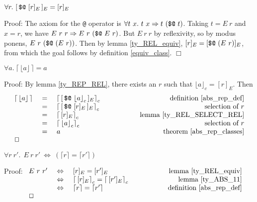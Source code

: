 \documentclass[envcountsame,runningheads]{llncs}
\begin{document}
\begin{lemma}
\label{ty_REL_SELECT_REL}
$\forall r.\ [ \, \mbox{\tt \$@} \ [ r ]_E \, ]_E = [ r ]_E$
\end{lemma}
Proof:
The axiom for the {\tt @} operator is
$\forall t\ x.\ t\ x \Rightarrow t\ (\mbox{\tt \$@}\ t)$.
Taking $t = E\ r$ and $x = r$, we have
$E\ r\ r \Rightarrow E\ r\ (\mbox{\tt \$@}\ E\ r)$.
But $E\ r\ r$ by reflexivity, so by modus ponens,
$E\ r\ (\mbox{\tt \$@} \ (E\ r))$.
Then
by lemma \ref{ty_REL_equiv},
$[ r ]_E = [ \mbox{\tt \$@} \ (E\ r) ]_E$, from which the goal follows
by definition \ref{equiv_class}.
$\Box$

\begin{theorem}
\label{ty_ABS_REP}
$\forall a.\ \lceil \, \lfloor a \rfloor \, \rceil = a$
\end{theorem}
Proof:
By lemma \ref{ty_REP_REL}, there exists an $r$ such that
$\lfloor a {\rfloor}_c = [ r ]_E$.  Then
$$
\begin{array}{rcl@{\hspace{2.0cm}}r}
\lceil \, \lfloor a \rfloor \, \rceil
& \ = \ &
\lceil \, [ \, \mbox{\tt \$@} \ \lfloor a {\rfloor}_c \, ]_E {\rceil}_c  
& \mbox{definition \ref{abs_rep_def}}  \\
& \ = \ &
\lceil \, [ \, \mbox{\tt \$@} \ [ r ]_E \, ]_E {\rceil}_c  
& \mbox{selection of $r$}  \\
& \ = \ &
\lceil \, [ r ]_E {\rceil}_c  
& \mbox{lemma \ref{ty_REL_SELECT_REL}}  \\
& \ = \ &
\lceil \, \lfloor a {\rfloor}_c {\rceil}_c  
& \mbox{selection of $r$}  \\
& \ = \ &
a 
& \mbox{theorem \ref{abs_rep_classes}}  \\
\Box \hfill & & &
\end{array}
$$


\begin{theorem}
\label{equiv_ty_ABS}
$\forall r\ r'.\ \ E\ r\ r' \ \Leftrightarrow \ 
(\lceil r \rceil = \lceil r' \rceil)$
\end{theorem}
Proof:
$
\begin{array}[t]{rcl@{\hspace{2.0cm}}r}
E\ r\ r'
& \ \Leftrightarrow \ &
[ r ]_E = [ r' ]_E
& \mbox{lemma \ref{ty_REL_equiv}}  \\
& \ \Leftrightarrow \ &
\lceil \, [ r ]_E {\rceil}_c = \lceil \, [ r' ]_E {\rceil}_c 
& \mbox{lemma \ref{ty_ABS_11}}  \\
& \ \Leftrightarrow \ &
\lceil r \rceil = \lceil r' \rceil 
& \mbox{definition \ref{abs_rep_def}}  \\
\Box \hfill & & &
\end{array}
$
\end{document}
